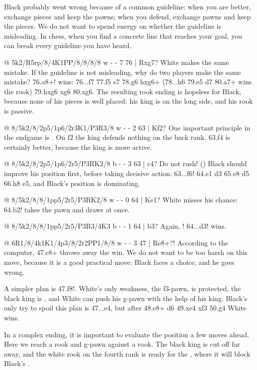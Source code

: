 Black probably went wrong because of a common guideline: when you are better, exchange pieces
and keep the pawns; when you defend, exchange pawns and keep the pieces. We do not want to spend
energy on whether the guideline is misleading. In chess, when you find a concrete line that
reaches your goal, you can break every guideline you have heard.

@ 5k2/R5rp/8/4K1PP/8/8/8/8 w - - 7 76 | Rxg7?
White makes the same mistake. If the guideline is not misleading, why do two players make the
same mistake? 76.\R a8+! wins: 76...\K f7 77.\K f5 \K e7 78.g6 hxg6+ (78...h6 79.\K e5 \K d7
80.\R a7+ wins the rook) 79.hxg6 \R xg6 80.\K xg6. The resulting rook ending is hopeless for
Black, because none of his pieces is well placed: his king is on the long side, and his rook is
passive.

@ 8/5k2/8/2p5/1p6/2r3K1/P3R3/8 w - - 2 63 | Kf2?
One important principle in the endgame is .
On f2 the king defends nothing on the back rank. 63.\K f4 is certainly better, because the king
is more active.

@ 8/5k2/8/2p5/1p6/2r5/P3RK2/8 b - - 3 63 | c4?
Do not rush! () Black should improve his position first, before
taking decisive action: 63...\K f6! 64.\K e1 \R d3 65.\R e8 \R d5 66.\R h8 \K e5, and Black's
position is dominating.

@ 8/5k2/8/8/1pp5/2r5/P3RK2/8 w - - 0 64 | Ke1?
White misses his chance: 64.\R b2! takes the pawn and draws at once.

@ 8/5k2/8/8/1pp5/2r5/P3R3/4K3 b - - 1 64 | b3?
Again, ! 64...\R d3! wins.

@ 6R1/8/4k1K1/4p3/8/2r2PP1/8/8 w - - 3 47 | Re8+?!
According to the computer, 47.\R e8+ throws away the win. We do not want to be too harsh on this
move, because it is a good practical move: Black faces a choice, and he goes wrong.

A simpler plan is 47.\R f8!. White's only weakness, the f3-pawn, is protected, the black king is
, and White can push his g-pawn with the help of his king.
Black's only try to spoil this plan is 47...e4, but after 48.\R e8+ \K d6 49.\R xe4 \R xf3 50.g4
White wins.

In a complex ending, it is important to evaluate the position a few moves ahead. Here we reach a
rook and g-pawn against a rook. The black king is cut off far away, and the white rook on the fourth
rank is ready for the , where it will block Black's .

